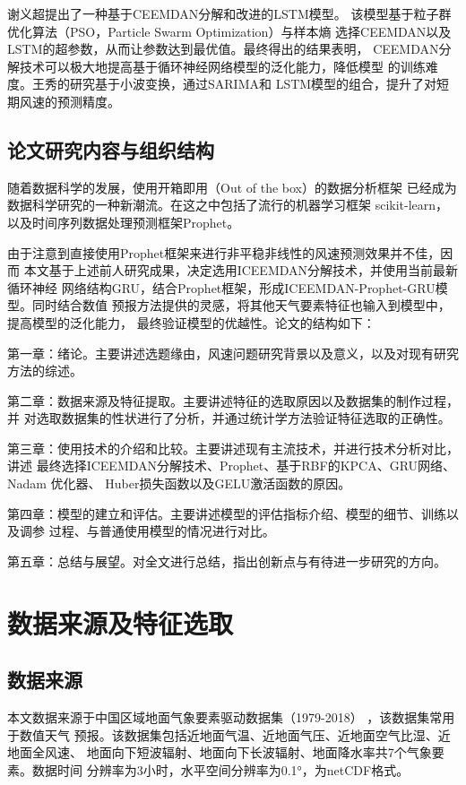 \documentclass[AutoFakeBold]{LZUThesis}
\begin{document}
谢义超\cite{谢义超2021基于}提出了一种基于CEEMDAN分解和改进的LSTM模型。
该模型基于粒子群优化算法（PSO，Particle Swarm Optimization）与样本熵
选择CEEMDAN以及LSTM的超参数，从而让参数达到最优值。最终得出的结果表明，
CEEMDAN分解技术可以极大地提高基于循环神经网络模型的泛化能力，降低模型
的训练难度。王秀的研究\cite{王秀2021基于}基于小波变换，通过SARIMA和
LSTM模型的组合，提升了对短期风速的预测精度。

\section{论文研究内容与组织结构}

随着数据科学的发展，使用开箱即用（Out of the box）的数据分析框架
已经成为数据科学研究的一种新潮流。在这之中包括了流行的机器学习框架
scikit-learn，以及时间序列数据处理预测框架Prophet。

由于注意到直接使用Prophet框架来进行非平稳非线性的风速预测效果并不佳，因而
本文基于上述前人研究成果，决定选用ICEEMDAN分解技术，并使用当前最新循环神经
网络结构GRU，结合Prophet框架，形成ICEEMDAN-Prophet-GRU模型。同时结合数值
预报方法提供的灵感，将其他天气要素特征也输入到模型中，提高模型的泛化能力，
最终验证模型的优越性。论文的结构如下：

第一章：绪论。主要讲述选题缘由，风速问题研究背景以及意义，以及对现有研究
方法的综述。

第二章：数据来源及特征提取。主要讲述特征的选取原因以及数据集的制作过程，并
对选取数据集的性状进行了分析，并通过统计学方法验证特征选取的正确性。

第三章：使用技术的介绍和比较。主要讲述现有主流技术，并进行技术分析对比，讲述
最终选择ICEEMDAN分解技术、Prophet、基于RBF的KPCA、GRU网络、Nadam 优化器、
Huber损失函数以及GELU激活函数的原因。

第四章：模型的建立和评估。主要讲述模型的评估指标介绍、模型的细节、训练以及调参
过程、与普通使用模型的情况进行对比。

第五章：总结与展望。对全文进行总结，指出创新点与有待进一步研究的方向。




\chapter{数据来源及特征选取}
\section{数据来源}
本文数据来源于中国区域地面气象要素驱动数据集（1979-2018）
\cite{8028b944-daaa-4511-8769-965612652c49}，该数据集常用于数值天气
预报。该数据集包括近地面气温、近地面气压、近地面空气比湿、近地面全风速、
地面向下短波辐射、地面向下长波辐射、地面降水率共7个气象要素。数据时间
分辨率为3小时，水平空间分辨率为0.1°，为netCDF格式。
\cite{37cab0ac-d066-4fb9-aa9c-1cf50d601096}
\end{document}
